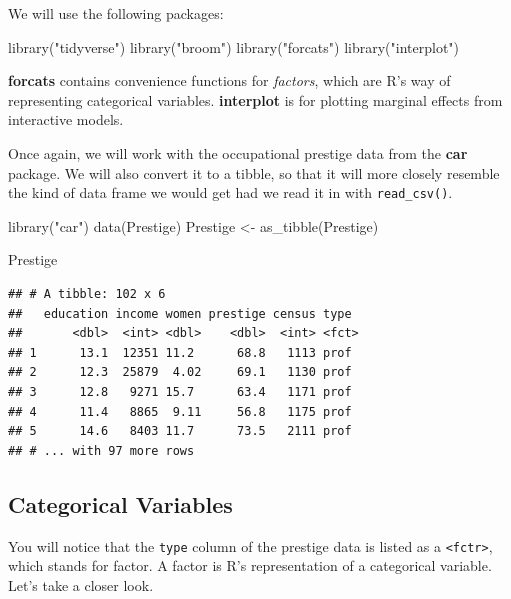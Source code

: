 \documentclass[
  12pt,
  oneside,openany]{book}
\newenvironment{Shaded}{\begin{snugshade}}{\end{snugshade}}
\newcommand{\FunctionTok}[1]{\textcolor[rgb]{0.00,0.00,0.00}{#1}}
\newcommand{\NormalTok}[1]{#1}
\newcommand{\OtherTok}[1]{\textcolor[rgb]{0.56,0.35,0.01}{#1}}
\newcommand{\StringTok}[1]{\textcolor[rgb]{0.31,0.60,0.02}{#1}}
\begin{document}
We will use the following packages:

\begin{Shaded}
\begin{Highlighting}[]
\FunctionTok{library}\NormalTok{(}\StringTok{"tidyverse"}\NormalTok{)}
\FunctionTok{library}\NormalTok{(}\StringTok{"broom"}\NormalTok{)}
\FunctionTok{library}\NormalTok{(}\StringTok{"forcats"}\NormalTok{)}
\FunctionTok{library}\NormalTok{(}\StringTok{"interplot"}\NormalTok{)}
\end{Highlighting}
\end{Shaded}

\textbf{forcats} contains convenience functions for \emph{factors}, which are R's way of representing categorical variables. \textbf{interplot} is for plotting marginal effects from interactive models.

Once again, we will work with the occupational prestige data from the \textbf{car} package. We will also convert it to a tibble, so that it will more closely resemble the kind of data frame we would get had we read it in with \texttt{read\_csv()}.

\begin{Shaded}
\begin{Highlighting}[]
\FunctionTok{library}\NormalTok{(}\StringTok{"car"}\NormalTok{)}
\FunctionTok{data}\NormalTok{(Prestige)}
\NormalTok{Prestige }\OtherTok{\textless{}{-}} \FunctionTok{as\_tibble}\NormalTok{(Prestige)}

\NormalTok{Prestige}
\end{Highlighting}
\end{Shaded}

\begin{verbatim}
## # A tibble: 102 x 6
##   education income women prestige census type 
##       <dbl>  <int> <dbl>    <dbl>  <int> <fct>
## 1      13.1  12351 11.2      68.8   1113 prof 
## 2      12.3  25879  4.02     69.1   1130 prof 
## 3      12.8   9271 15.7      63.4   1171 prof 
## 4      11.4   8865  9.11     56.8   1175 prof 
## 5      14.6   8403 11.7      73.5   2111 prof 
## # ... with 97 more rows
\end{verbatim}

\hypertarget{categorical-variables-1}{%
\subsection{Categorical Variables}\label{categorical-variables-1}}

You will notice that the \texttt{type} column of the prestige data is listed as a \texttt{\textless{}fctr\textgreater{}}, which stands for factor. A factor is R's representation of a categorical variable. Let's take a closer look.
\end{document}
